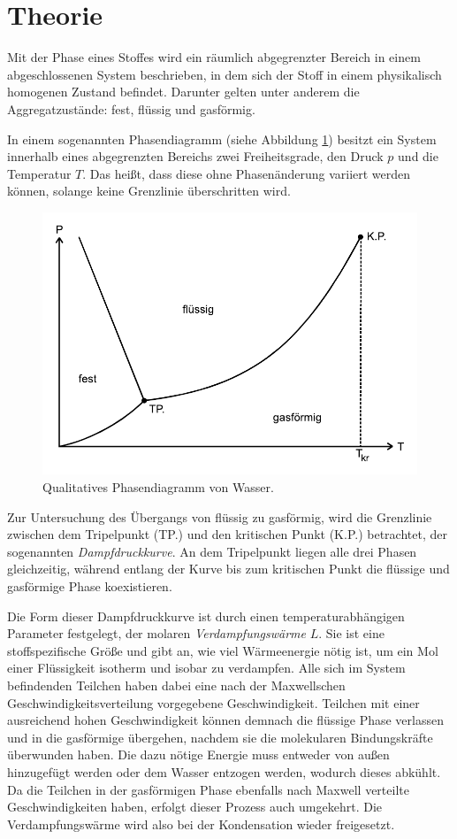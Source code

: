 \section{Theorie}
\label{sec:Theorie}

Mit der Phase eines Stoffes wird ein räumlich abgegrenzter Bereich in einem abgeschlossenen System beschrieben,
in dem sich der Stoff in einem physikalisch homogenen Zustand befindet. 
Darunter gelten unter anderem die Aggregatzustände: fest, flüssig und gasförmig.

In einem sogenannten Phasendiagramm (siehe Abbildung \ref{fig:phasendiagramm}) besitzt ein System
innerhalb eines abgegrenzten Bereichs zwei Freiheitsgrade, den Druck $p$ und die Temperatur $T$.
Das heißt, dass diese ohne Phasenänderung variiert werden können, solange keine Grenzlinie überschritten wird.
\begin{figure} 
    \centering
    \includegraphics[width=12cm] {pictures/phasendiagramm.pdf}  
    \caption{Qualitatives Phasendiagramm von Wasser. \cite[1]{v203}}
    \label{fig:phasendiagramm}
\end{figure}

Zur Untersuchung des Übergangs von flüssig zu gasförmig, wird die Grenzlinie zwischen dem
Tripelpunkt (TP.) und den kritischen Punkt (K.P.) betrachtet, der sogenannten \textit{Dampfdruckkurve}.
An dem Tripelpunkt liegen alle drei Phasen gleichzeitig, während entlang der Kurve bis zum
kritischen Punkt die flüssige und gasförmige Phase koexistieren.

Die Form dieser Dampfdruckkurve ist durch einen temperaturabhängigen Parameter festgelegt, 
der molaren \textit{Verdampfungswärme} $L$. 
Sie ist eine stoffspezifische Größe und gibt an, wie viel Wärmeenergie nötig ist, 
um ein Mol einer Flüssigkeit isotherm und isobar zu verdampfen.
Alle sich im System befindenden Teilchen haben dabei eine nach der Maxwellschen Geschwindigkeitsverteilung
vorgegebene Geschwindigkeit. 
Teilchen mit einer ausreichend hohen Geschwindigkeit können demnach die flüssige Phase verlassen und in die
gasförmige übergehen, nachdem sie die molekularen Bindungskräfte überwunden haben.
Die dazu nötige Energie muss entweder von außen hinzugefügt werden oder dem Wasser entzogen werden,
wodurch dieses abkühlt. 
Da die Teilchen in der gasförmigen Phase ebenfalls nach Maxwell verteilte Geschwindigkeiten haben, 
erfolgt dieser Prozess auch umgekehrt. 
Die Verdampfungswärme wird also bei der Kondensation wieder freigesetzt.

